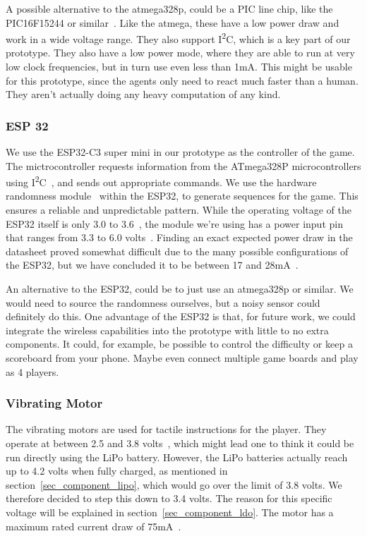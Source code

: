 \documentclass[acmsmall]{acmart}
\begin{document}
A possible alternative to the atmega328p, could be a PIC line chip, like the PIC16F15244 or similar~\cite{atmegaalternative}. Like the atmega, these have a low power draw 
and work in a wide voltage range. They also support I\textsuperscript{2}C, which is a key part of our prototype. They also have a low power mode, where they are able to run
at very low clock frequencies, but in turn use even less than 1mA. This might be usable for this prototype, since the agents only need to react much faster than a human.
They aren't actually doing any heavy computation of any kind.

\subsubsection{ESP 32}\label{sec_component_esp32}
We use the ESP32-C3 super mini in our prototype as the controller of the game. The mictrocontroller requests information from the ATmega328P microcontrollers using 
I\textsuperscript{2}C~\cite[][p.4]{esp32}, and sends out appropriate commands. We use the hardware randomness module~\cite[][p.5]{esp32} within the ESP32, 
to generate sequences for the game. This ensures a reliable and unpredictable pattern. 
While the operating voltage of the ESP32 itself is only 3.0 to 3.6~\cite[][p.53]{esp32}, 
the module we're using has a power input pin that ranges from 3.3 to 6.0 volts~\cite[][p.3]{esp32supermini}.
Finding an exact expected power draw in the datasheet proved somewhat difficult due to the many possible configurations of the ESP32, but we have concluded it to be 
between 17 and 28mA~\cite[][p.56]{esp32}. 

An alternative to the ESP32, could be to just use an atmega328p or similar. We would need to source the randomness ourselves, but a noisy sensor could definitely do this. 
One advantage of the ESP32 is that, for future work, we could integrate the wireless capabilities into the prototype with little to no extra components. 
It could, for example, be possible to control the difficulty or keep a scoreboard from your phone. Maybe even connect multiple game boards and play as 4 players.

\subsubsection{Vibrating Motor}\label{sec_component_vibratingmotor}
The vibrating motors are used for tactile instructions for the player. They operate at between 2.5 and 3.8 volts~\cite[][p.5]{vibratingmotor},
which might lead one to think it could be run directly using the LiPo battery. However, the LiPo batteries actually reach up to 4.2 volts when fully charged, 
as mentioned in section~\ref{sec_component_lipo}, which would go over the limit of 3.8 volts. We therefore decided to step this down to 3.4 volts. 
The reason for this specific voltage will be explained in section~\ref{sec_component_ldo}. The motor has a maximum rated current draw of 75mA~\cite[][p.5]{vibratingmotor}.
\end{document}
